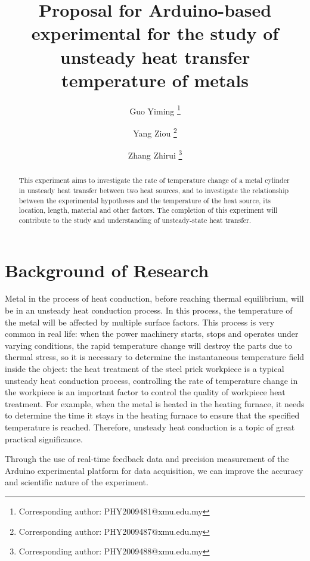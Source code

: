 \documentclass[a4paper,12pt]{article}
\title{Proposal for Arduino-based experimental for the study of unsteady heat transfer temperature of metals}
\author[a]{Guo Yiming \thanks{Corresponding author: PHY2009481@xmu.edu.my}}
\author[a]{Yang Ziou \thanks{Corresponding author: PHY2009487@xmu.edu.my}}
\author[a]{Zhang Zhirui \thanks{Corresponding author: PHY2009488@xmu.edu.my}}
\affil[a]{Department of Physics, Xiamen University, Malaysia}
\begin{document}
\maketitle
\tableofcontents
\begin{abstract}
	This experiment aims to investigate the rate of temperature change of a metal cylinder in unsteady heat transfer between two heat sources, and to investigate the relationship between the experimental hypotheses and the temperature of the heat source, its location, length, material and other factors. The completion of this experiment will contribute to the study and understanding of unsteady-state heat transfer.
\end{abstract}



\section{Background of Research}
Metal in the process of heat conduction, before reaching thermal equilibrium, will be in an unsteady heat conduction process.\cite{blundell_concepts_2010} In this process, the temperature of the metal will be affected by multiple surface factors. This process is very common in real life: when the power machinery starts, stops and operates under varying conditions, the rapid temperature change will destroy the parts due to thermal stress, so it is necessary to determine the instantaneous temperature field inside the object: the heat treatment of the steel prick workpiece is a typical unsteady heat conduction process, controlling the rate of temperature change in the workpiece is an important factor to control the quality of workpiece heat treatment. For example, when the metal is heated in the heating furnace, it needs to determine the time it stays in the heating furnace to ensure that the specified temperature is reached.\cite{young_sears_2016} Therefore, unsteady heat conduction is a topic of great practical significance.


Through the use of real-time feedback data and precision measurement of the Arduino experimental platform for data acquisition, we can improve the accuracy and scientific nature of the experiment.
\end{document}
